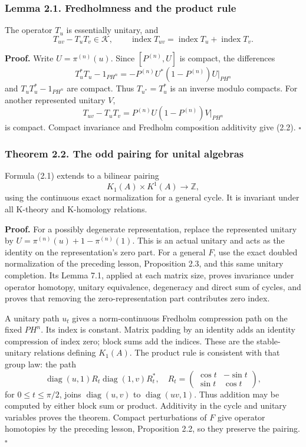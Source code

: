 \documentclass[
  11pt,
]{article}
\begin{document}
\subsubsection{Lemma 2.1. Fredholmness and the product
rule}\label{lemma-2.1.-fredholmness-and-the-product-rule}

The operator \(T_u\) is essentially unitary, and \[
T_{uv}-T_uT_v\in\mathcal K,\qquad
\operatorname{index}T_{uv}
=\operatorname{index}T_u+\operatorname{index}T_v.
\tag{2.2}
\]

\textbf{Proof.} Write \(U=\pi^{(n)}(u)\). Since \([P^{(n)},U]\) is
compact, the differences \[
T_u^*T_u-1_{PH^n}
=-P^{(n)}U^*(1-P^{(n)})U|_{PH^n}
\] and \(T_uT_u^*-1_{PH^n}\) are compact. Thus \(T_{u^*}=T_u^*\) is an
inverse modulo compacts. For another represented unitary \(V\), \[
T_{uv}-T_uT_v
=P^{(n)}U(1-P^{(n)})V|_{PH^n}
\] is compact. Compact invariance and Fredholm composition additivity
give (2.2). \(\square\)

\subsubsection{Theorem 2.2. The odd pairing for unital
algebras}\label{theorem-2.2.-the-odd-pairing-for-unital-algebras}

Formula (2.1) extends to a bilinear pairing \[
K_1(A)\times K^1(A)\longrightarrow\mathbb Z,
\tag{2.3}
\] using the continuous exact normalization for a general cycle. It is
invariant under all K-theory and K-homology relations.

\textbf{Proof.} For a possibly degenerate representation, replace the
represented unitary by \(U=\pi^{(n)}(u)+1-\pi^{(n)}(1)\). This is an
actual unitary and acts as the identity on the representation's zero
part. For a general \(F\), use the exact doubled normalization of the
preceding lesson, Proposition 2.3, and this same unitary completion. Its
Lemma 7.1, applied at each matrix size, proves invariance under operator
homotopy, unitary equivalence, degeneracy and direct sum of cycles, and
proves that removing the zero-representation part contributes zero
index.

A unitary path \(u_t\) gives a norm-continuous Fredholm compression path
on the fixed \(PH^n\). Its index is constant. Matrix padding by an
identity adds an identity compression of index zero; block sums add the
indices. These are the stable-unitary relations defining \(K_1(A)\). The
product rule is consistent with that group law: the path \[
\operatorname{diag}(u,1)R_t\operatorname{diag}(1,v)R_t^*,
\quad
R_t=\begin{pmatrix}\cos t&-\sin t\\
                         \sin t&\cos t\end{pmatrix},
\] for \(0\leq t\leq\pi/2\), joins \(\operatorname{diag}(u,v)\) to
\(\operatorname{diag}(uv,1)\). Thus addition may be computed by either
block sum or product. Additivity in the cycle and unitary variables
proves the theorem. Compact perturbations of \(F\) give operator
homotopies by the preceding lesson, Proposition 2.2, so they preserve
the pairing. \(\square\)
\end{document}
